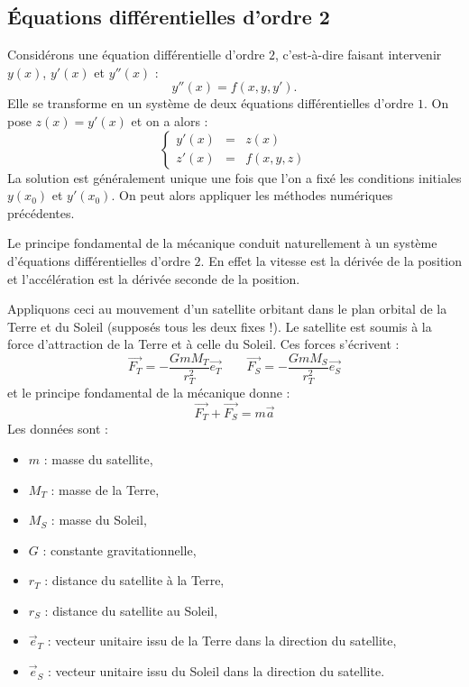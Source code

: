 \documentclass[11pt,class=report,crop=false]{standalone}
\begin{document}
\subsection{Équations différentielles d'ordre 2}

Considérons une équation différentielle d'ordre $2$, c'est-à-dire faisant intervenir $y(x)$, $y'(x)$ et $y''(x)$ :
$$y''(x) = f(x,y,y').$$
Elle se transforme en un système de deux équations différentielles d'ordre $1$. On pose $z(x) = y'(x)$ et on a alors :
$$\left\lbrace
\begin{array}{rcl}
  y'(x) &=& z(x) \\
  z'(x) &=& f(x,y,z)
\end{array}
\right.$$
La solution est généralement unique une fois que l'on a fixé les conditions initiales $y(x_0)$ et $y'(x_0)$. On peut alors appliquer les méthodes numériques précédentes.


\bigskip

Le principe fondamental de la mécanique conduit naturellement à un système d'équations différentielles d'ordre $2$. En effet la vitesse est la dérivée de la position et l'accélération est la dérivée seconde de la position.

Appliquons ceci au mouvement d'un satellite orbitant dans le plan orbital de la Terre et du Soleil (supposés tous les deux fixes !). Le satellite est soumis à la force d'attraction de la Terre et à celle du Soleil.
Ces forces s'écrivent :
$$\vec{F_T} = - \frac{G m M_T}{r_T^2} \vec{e_T}
\qquad
\vec{F_S} = - \frac{G m M_S}{r_T^2} \vec{e_S}$$
et le principe fondamental de la mécanique donne :
$$\vec{F_T} + \vec{F_S} = m \vec a$$
Les données sont :
\begin{itemize}
  \item $m$ : masse du satellite,
  \item $M_T$ : masse de la Terre,
  \item $M_S$ : masse du Soleil,
  \item $G$ : constante gravitationnelle,
  \item $r_T$ : distance du satellite à la Terre,
  \item $r_S$ : distance du satellite au Soleil,
  \item $\vec e_T$ : vecteur unitaire issu de la Terre dans la direction du satellite,
  \item $\vec e_S$ : vecteur unitaire issu du Soleil dans la direction du satellite.
\end{itemize}
\end{document}

